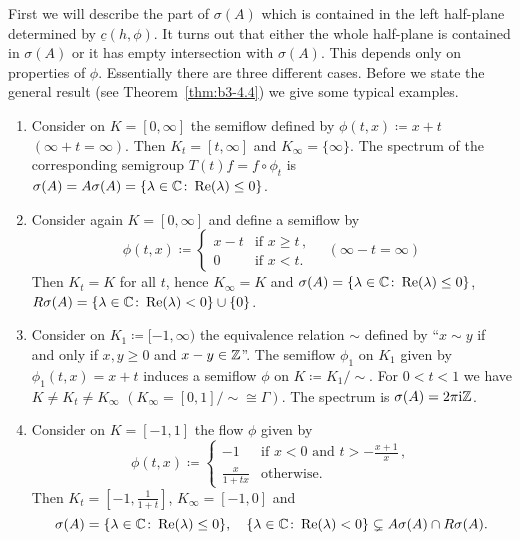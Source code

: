 First we will describe the part of $\sigma(A)$ which is contained in the left half-plane determined by $\underline{c}(h,\phi)$.
It turns out that either the whole half-plane is contained in $\sigma(A)$ or it has empty intersection with $\sigma(A)$.
This depends only on properties of $\phi$.
Essentially there 
are three different cases. 
Before we state the general result (see Theorem~\ref{thm:b3-4.4}) we give some typical examples.
\begin{examples}\label{ex:b3-4.3}%
	\begin{enumerate}[\upshape (i), wide, labelindent=.5em]
	\item 
	Consider on $K = [0,\infty]$ the semiflow defined by $\phi(t,x) \coloneq x + t$ $(\infty + t = \infty)$.
	Then $K_{t} = [t,\infty]$ and $K_{\infty} = \{\infty\}$.
	The spectrum of the corresponding semigroup $T(t)f = f\circ\phi_{t}$ is $\sigma(A) = A\sigma(A) = \{\lambda \in \mathbb{C} \colon \mathop{}\!\mathrm{Re}(\lambda) \leq 0\}$.
	
	\item 
	Consider again $K = [0,\infty]$ and define a semiflow by
	\[
	\phi(t,x) \coloneq \begin{cases} 
		x - t & \text{if } x \geq t \,,\\
		0 & \text{if } x < t .
	\end{cases} \quad (\infty - t = \infty)
	\]
	Then $K_{t} = K$ for all $t$, hence $K_{\infty} = K$ and $\sigma(A) = \{\lambda \in \mathbb{C} \colon \mathop{}\!\mathrm{Re}(\lambda) \leq 0\}$, $R\sigma(A) = \{\lambda \in \mathbb{C} \colon \mathop{}\!\mathrm{Re}(\lambda) < 0\} \cup \{0\}$.
	
	\item 
	Consider on $K_{1} \coloneq [-1,\infty)$ the equivalence relation $\sim$ defined by \enquote{$x \sim y$ if and only if $x,y \geq 0$ and $x - y \in \mathbb{Z}$}.
	The semiflow $\phi_{1}$ on $K_{1}$ given by $\phi_{1}(t,x) = x + t$ induces a semiflow $\phi$ on $K \coloneq K_{1}/{\sim}$.
	For $0 < t < 1$ we have $K \neq K_{t} \neq K_{\infty}$ $(K_{\infty} = [0,1]/{\sim} \cong \Gamma)$.
	The spectrum is $\sigma(A) = 2\pi \mathrm{i}\mathbb{Z}$.
	
	\item 
	Consider on $K = [-1,1]$ the flow $\phi$ given by
	\[
	\phi(t,x)\coloneq \begin{cases}
		-1 & \text{if } x < 0 \text{ and } t > -\frac{x+1}{x} \,, \\
		\frac{x}{1+tx} & \text{otherwise} .
	\end{cases}
	\]
	Then $K_{t} = [-1,\frac{1}{1+t}]$, $K_{\infty} = [-1,0]$ and
	\[
	\sigma(A) = \{\lambda \in \mathbb{C} \colon \mathop{}\!\mathrm{Re}(\lambda) \leq 0\},\quad 
	\{\lambda \in \mathbb{C} \colon \mathop{}\!\mathrm{Re}(\lambda) < 0\} \subsetneq A\sigma(A)\cap R\sigma(A).
	\]
	\end{enumerate}
\end{examples}
